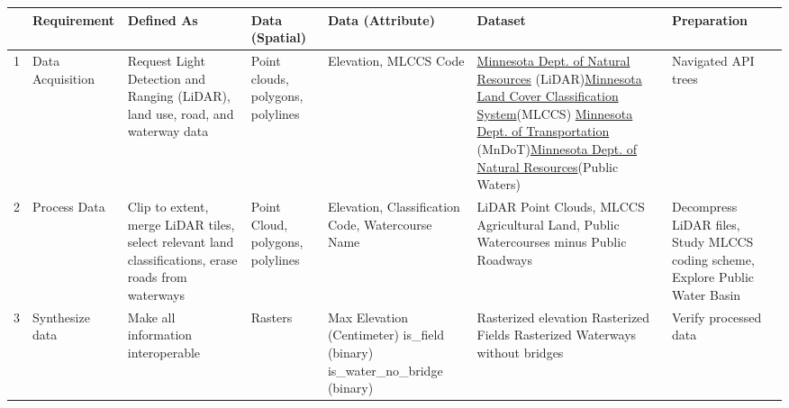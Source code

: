 \documentclass[article,12pt]{article}
\numberwithin{equation}{section}
\begin{document}
\begin{adjustwidth}{-.88in}{-.88in}
{
	\scriptsize
	\begin{tabular}{|l|p{.09\linewidth}|p{.17\linewidth}|p{.065\linewidth}|p{.1\linewidth}|p{.28\linewidth}|p{.15\linewidth}|}
	\hline	& \textbf{Requirement} & \textbf{Defined As} & \textbf{Data (Spatial)} & \textbf{Data} \newline \textbf{(Attribute)} & \textbf{Dataset} & \textbf{Preparation} \\ \hline
		1 &  Data Acquisition      &    Request  Light Detection and Ranging (LiDAR), land use, road, and waterway data                                                             & Point clouds, polygons, polylines  \vspace{.04in}        &   Elevation, MLCCS Code                                            &  \href{https://resources.gisdata.mn.gov/pub/data/elevation/lidar/}{Minnesota Dept. of Natural Resources}\newline
			(LiDAR)\newline \href{https://gisdata.mn.gov/dataset/biota-landcover-mlccs}{Minnesota Land Cover Classification System}\newline	(MLCCS) \newline \href{https://gisdata.mn.gov/dataset/trans-aadt-traffic-count-locs}{Minnesota Dept. of Transportation}\newline
	 (MnDoT)\newline \href{https://gisdata.mn.gov/dataset/water-mn-public-waters}{Minnesota Dept. of Natural Resources}\newline (Public Waters)                                                                                                           &       Navigated API trees \\ \hline
	   2 & Process Data & Clip to extent, merge LiDAR tiles,  select relevant land classifications, erase roads from waterways & Point Cloud, polygons,  polylines & Elevation, Classification Code, Watercourse Name & LiDAR Point Clouds, MLCCS Agricultural Land, Public Watercourses minus Public Roadways & Decompress LiDAR files, Study MLCCS coding scheme, Explore Public Water Basin \\ \hline	   
	   3 & Synthesize data & Make all information interoperable & Rasters & Max Elevation (Centimeter) \newline is\_field (binary) \newline is\_water\_no\_bridge (binary) & Rasterized elevation \newline Rasterized Fields \newline Rasterized Waterways without bridges & Verify processed data \\ \hline

\end{tabular}}
\end{adjustwidth}
\end{document}
